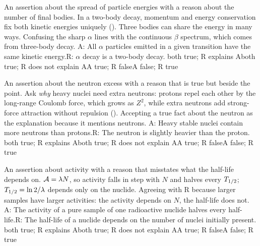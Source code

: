 {An assertion about the spread of particle energies with a reason about the number of final bodies.}
{In a two-body decay, momentum and energy conservation fix both kinetic energies uniquely
(). Three bodies can share the energy in many ways.}
{Confusing the sharp $\alpha$ lines with the continuous $\beta$ spectrum, which comes from three-body decay.}
{A: All $\alpha$ particles emitted in a given transition have the same kinetic energy.\quad R: $\alpha$ decay
is a two-body decay.}
{both true; R explains A}{both true; R does not explain A}{A true; R false}{A false; R true}

{An assertion about the neutron excess with a reason that is true but beside the point.}
{Ask \emph{why} heavy nuclei need extra neutrons: protons repel each other by the long-range Coulomb force,
which grows as $Z^2$, while extra neutrons add strong-force attraction without repulsion ().}
{Accepting a true fact about the neutron as the explanation because it mentions neutrons.}
{A: Heavy stable nuclei contain more neutrons than protons.\quad R: The neutron is slightly heavier than the
proton.}
{both true; R explains A}{both true; R does not explain A}{A true; R false}{A false; R true}

{An assertion about activity with a reason that misstates what the half-life depends on.}
{$\mathcal{A}=\lambda N$, so activity falls in step with $N$ and halves every $T_{1/2}$; $T_{1/2}=\ln2/\lambda$ depends
only on the nuclide.}
{Agreeing with R because larger samples have larger activities: the activity depends on $N$, the half-life
does not.}
{A: The activity of a pure sample of one radioactive nuclide halves every half-life.\quad R: The half-life of a
nuclide depends on the number of nuclei initially present.}
{both true; R explains A}{both true; R does not explain A}{A true; R false}{A false; R true}

